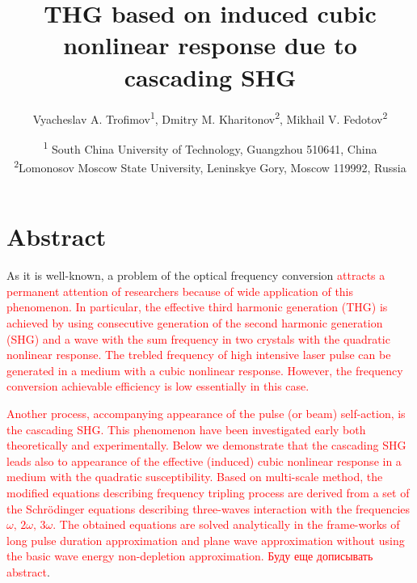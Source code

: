 \documentclass[a4paper, 12pt, onecolumn]{extarticle}
\begin{document}
\newtheorem{theorem}{Theorem}
\author{Vyacheslav A. Trofimov\textsuperscript{1}, Dmitry M. Kharitonov\textsuperscript{2}, Mikhail V. Fedotov\textsuperscript{2}}
\title{THG based on induced cubic nonlinear response due to cascading SHG}

\date{\textsuperscript{1} South China University of Technology, Guangzhou 510641, China\\
\textsuperscript{2}Lomonosov Moscow State University, Leninskye Gory, Moscow 119992, Russia}
\maketitle
\section*{Abstract}
As it is well-known, a problem of the optical frequency conversion \textcolor{red}{ attracts a permanent attention of researchers because of wide application of this phenomenon. In particular, the effective third harmonic generation (THG) is achieved by using  consecutive generation of  the second harmonic generation (SHG) and a wave with the sum frequency in two crystals with the quadratic nonlinear response.  The trebled frequency of high intensive laser pulse can be generated  in a medium with a cubic nonlinear response. However, the frequency conversion achievable efficiency is low essentially in this case.}



\textcolor{red}{
Another process, accompanying appearance of the pulse (or beam) self-action, is the cascading SHG.  This phenomenon have been investigated early both theoretically and experimentally. Below we demonstrate that the cascading SHG leads also to appearance of the effective (induced) cubic nonlinear response in a medium with the quadratic susceptibility. Based on multi-scale method, the modified equations describing frequency tripling process are derived from a set of the    Schr\"{o}dinger equations describing three-waves interaction with the frequencies \(\omega,\,2\omega,\,3\omega\).  The obtained equations are solved analytically in the frame-works of long pulse  duration approximation and plane wave approximation without using the basic wave  energy non-depletion approximation.}
\textcolor{red}{Буду еще дописывать abstract}.   
\end{document}
